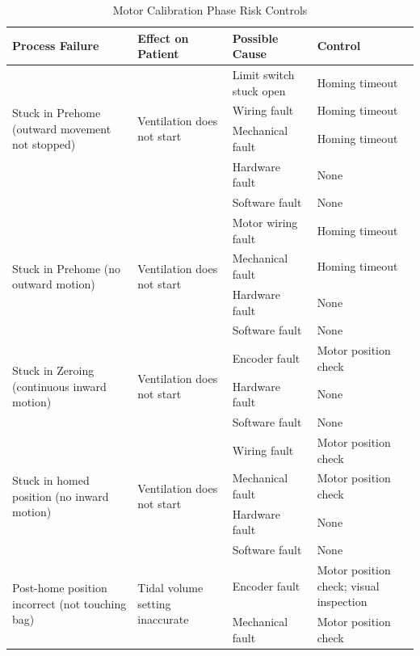 \documentclass[]{article}
\begin{document}
\begin{center}
\begin{table}[h]
\caption{Motor Calibration Phase Risk Controls}
\label{tab:motor_cal_risk}
\begin{tabular}{ |p{3.5cm}|p{3cm}| p{3.5cm}| p{3.5cm}|}

	
	\hline
	\textbf{Process Failure}& \textbf{Effect on Patient} &\textbf{Possible Cause} & \textbf{Control}  \\ \hline
	\multirow{4}{3.5cm}{Stuck in Prehome (outward movement not stopped)} & \multirow{4}{3cm}{Ventilation does not start} & Limit switch stuck open & Homing timeout\\ \cline{3-4}
	& & Wiring fault & Homing timeout\\ \cline{3-4}
	& & Mechanical fault & Homing timeout\\ \cline{3-4}
	& & Hardware fault & None\\ \cline{3-4}
	& & Software fault & None\\ \hline
	\multirow{4}{3.5cm}{Stuck in Prehome (no outward motion)} & \multirow{4}{3cm}{Ventilation does not start} & Motor wiring fault & Homing timeout\\ \cline{3-4}
	& & Mechanical fault & Homing timeout\\ \cline{3-4}
	& & Hardware fault & None\\ \cline{3-4}
	& & Software fault & None\\ \hline
	\multirow{3}{3.5cm}{Stuck in Zeroing (continuous inward motion)} & \multirow{3}{3cm}{Ventilation does not start} & Encoder fault & Motor position check\\ \cline{3-4}
	& & Hardware fault & None\\ \cline{3-4}
	& & Software fault & None\\ \hline
	\multirow{4}{3.5cm}{Stuck in homed position (no inward motion)} & \multirow{4}{3cm}{Ventilation does not start} & Wiring fault & Motor position check\\ \cline{3-4}
	& & Mechanical fault & Motor position check\\ \cline{3-4}
	& & Hardware fault & None\\ \cline{3-4}
	& & Software fault & None\\ \hline
	\multirow{4}{3.5cm}{Post-home position incorrect (not touching bag)} & \multirow{4}{3cm}{Tidal volume setting inaccurate} & Encoder fault & Motor position check; visual inspection\\ \cline{3-4}
	& & Mechanical fault & Motor position check\\ \cline{3-4}

\end{tabular}
\end{table}
\end{center}
\end{document}

